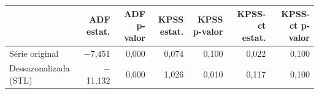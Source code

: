 \begin{tabular}{lrrrrrr}
\toprule
 & ADF estat. & ADF p-valor & KPSS estat. & KPSS p-valor & KPSS-ct estat. & KPSS-ct p-valor \\
\midrule
Série original & $-$7,451 & 0,000 & 0,074 & 0,100 & 0,022 & 0,100 \\
Dessazonalizada (STL) & $-$11,132 & 0,000 & 1,026 & 0,010 & 0,117 & 0,100 \\
\bottomrule
\end{tabular}
